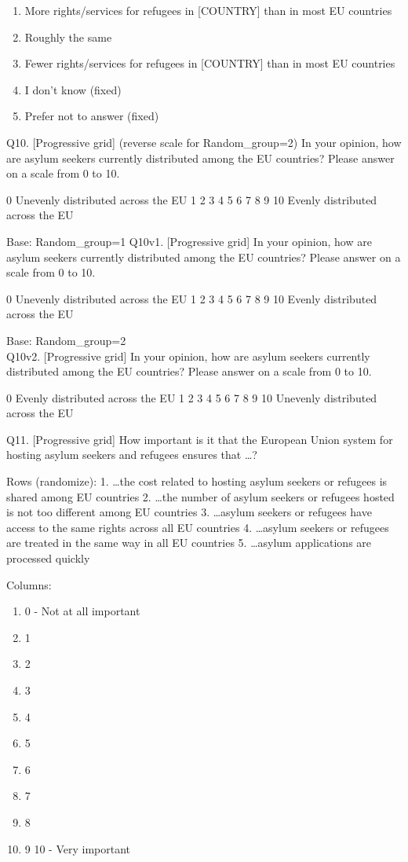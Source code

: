 \documentclass[
  12pt,
  a4paper,
]{article}
\providecommand{\tightlist}{%
  \setlength{\itemsep}{0pt}\setlength{\parskip}{0pt}}
\begin{document}
\begin{enumerate}
\def\labelenumi{\arabic{enumi}.}
\tightlist
\item
  More rights/services for refugees in {[}COUNTRY{]} than in most EU countries
\item
  Roughly the same
\item
  Fewer rights/services for refugees in {[}COUNTRY{]} than in most EU countries
\item
  I don't know (fixed)
\item
  Prefer not to answer (fixed)
\end{enumerate}

Q10. {[}Progressive grid{]} (reverse scale for Random\_group=2) In your opinion, how are asylum seekers currently distributed among the EU countries? Please answer on a scale from 0 to 10.

0
Unevenly distributed across the EU 1 2 3 4 5 6 7 8 9 10
Evenly distributed across the EU

Base: Random\_group=1
Q10v1. {[}Progressive grid{]} In your opinion, how are asylum seekers currently distributed among the EU countries? Please answer on a scale from 0 to 10.

0
Unevenly distributed across the EU 1 2 3 4 5 6 7 8 9 10
Evenly distributed across the EU

Base: Random\_group=2\\
Q10v2. {[}Progressive grid{]} In your opinion, how are asylum seekers currently distributed among the EU countries? Please answer on a scale from 0 to 10.

0
Evenly distributed across the EU 1 2 3 4 5 6 7 8 9 10
Unevenly distributed across the EU

Q11. {[}Progressive grid{]} How important is it that the European Union system for hosting asylum seekers and refugees ensures that \ldots?

Rows (randomize):
1. \ldots the cost related to hosting asylum seekers or refugees is shared among EU countries
2. \ldots the number of asylum seekers or refugees hosted is not too different among EU countries
3. \ldots asylum seekers or refugees have access to the same rights across all EU countries
4. \ldots asylum seekers or refugees are treated in the same way in all EU countries
5. \ldots asylum applications are processed quickly

Columns:

\begin{enumerate}
\def\labelenumi{\arabic{enumi}.}
\tightlist
\item
  0 - Not at all important\\
\item
  1
\item
  2
\item
  3
\item
  4
\item
  5
\item
  6
\item
  7
\item
  8
\item
  9
  10 - Very important
\end{enumerate}
\end{document}
